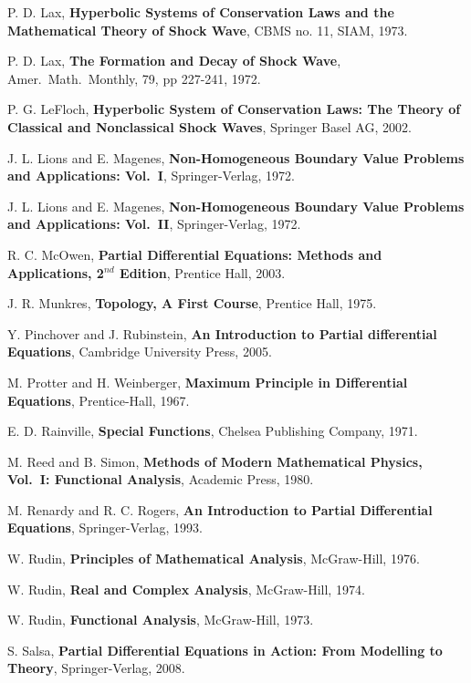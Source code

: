 \begin{thebibliography}{99}
 P. D. Lax,
{\bfseries Hyperbolic Systems of Conservation Laws and the
Mathematical Theory of Shock Wave}, CBMS no. 11, SIAM, 1973.

 P. D. Lax,
{\bfseries The Formation and Decay of Shock Wave}, Amer.\ Math.\ Monthly, 79,
pp 227-241, 1972.

 P. G. LeFloch,
{\bfseries Hyperbolic System of Conservation Laws: The Theory of
Classical and Nonclassical Shock Waves}, Springer Basel AG, 2002.

 J. L. Lions and E. Magenes,
{\bfseries Non-Homogeneous Boundary Value Problems and Applications:
Vol.\ I}, Springer-Verlag, 1972.

 J. L. Lions and E. Magenes,
{\bfseries Non-Homogeneous Boundary Value Problems and Applications:
Vol.\ II}, Springer-Verlag, 1972.

 R. C. McOwen,
{\bfseries Partial Differential Equations: Methods and Applications,
2$^{nd}$ Edition}, Prentice Hall, 2003.

 J. R. Munkres,
{\bfseries Topology, A First Course}, Prentice Hall, 1975.

 Y. Pinchover and J. Rubinstein,
{\bfseries An Introduction to Partial differential Equations},
Cambridge University Press, 2005.

 M. Protter and H. Weinberger,
{\bfseries Maximum Principle in Differential Equations}, Prentice-Hall, 1967.

 E. D. Rainville, {\bfseries Special Functions}, Chelsea
  Publishing Company, 1971.

 M. Reed and B. Simon,
{\bfseries Methods of Modern Mathematical Physics, Vol.\ I: Functional
Analysis}, Academic Press, 1980.

 M. Renardy and R. C. Rogers,
{\bfseries An Introduction to Partial Differential Equations},
Springer-Verlag, 1993.

 W. Rudin, {\bfseries Principles of Mathematical Analysis},
McGraw-Hill, 1976.

 W. Rudin, {\bfseries Real and Complex Analysis},
McGraw-Hill, 1974.

 W. Rudin, {\bfseries Functional Analysis},
McGraw-Hill, 1973.

 S. Salsa, {\bfseries Partial Differential Equations in
Action: From Modelling to Theory}, Springer-Verlag, 2008. 


\end{thebibliography}
